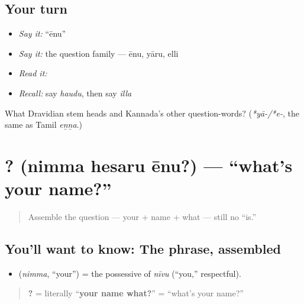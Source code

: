 \subsection*{Your turn}
\begin{itemize}
\raggedright
  \item \emph{Say it:} \textquotedblleft{}ēnu\textquotedblright{}
  \item \emph{Say it:} the question family — ēnu, yāru, elli
  \item \emph{Read it:} \textbf{}
  \item \emph{Recall:} say \emph{haudu}, then say \emph{illa}
\end{itemize}

\begin{tcolorbox}[breakable,colback=teal!4,colframe=teal!35!black,title={Before you move on}]
What Dravidian stem heads \textbf{} and Kannada's other question-words? (\emph{*yā-/*e-}, the same as Tamil \emph{eṉṉa}.)
\end{tcolorbox}
\section[\texorpdfstring{\kn{ನಿಮ್ಮ} \kn{ಹೆಸರು} \kn{ಏನು}? (nimma hesaru ēnu?)}{ನಿಮ್ಮ ಹೆಸರು ಏನು? (nimma hesaru ēnu?)}]{  ? (nimma hesaru ēnu?) — \textquotedblleft{}what's your name?\textquotedblright{}}

\label{lesson:KA-C02-nimma-hesaru-enu}



\begin{quote}
Assemble the question — your + name + what — still no \textquotedblleft{}is.\textquotedblright{}
\end{quote}

\subsection*{You'll want to know: The phrase, assembled}
\begin{itemize}
\raggedright
  \item \textbf{} (\emph{nimma}, \textquotedblleft{}your\textquotedblright{}) = the possessive of \emph{nīvu} (\textquotedblleft{}you,\textquotedblright{} respectful).
\end{itemize}

\begin{quote}
\textbf{  ?} = literally \textquotedblleft{}\textbf{your name what?}\textquotedblright{} = \textquotedblleft{}what's your name?\textquotedblright{}
\end{quote}

